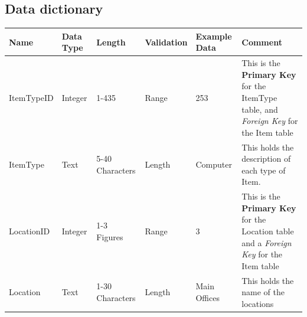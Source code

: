 \begin{landscape}

    \begin{center}
    \subsection{Data dictionary}
    \end{center}
    
    \begin{center}
        \begin{tabular}{|p{3cm}|p{2cm}|p{3cm}|p{2cm}|p{2cm}|p{5cm}|}
            \hline
            \textbf{Name} & \textbf{Data Type} & \textbf{Length} & \textbf{Validation} & \textbf{Example Data} & \textbf{Comment} \\ \hline
            ItemTypeID & Integer & 1-435           & Range  & 253           & This is the \textbf{Primary Key} for the ItemType table, and \emph{Foreign Key} for the 
                                                                              Item table \\ \hline
            ItemType   & Text    & 5-40 Characters & Length & Computer      & This holds the description of each type of Item. \\ \hline
            LocationID & Integer & 1-3 Figures     & Range  & 3             & This is the \textbf{Primary Key} for the Location table and a \emph{Foreign Key} for the 
                                                                              Item table \\ \hline
            Location   & Text    & 1-30 Characters & Length & Main Offices  & This holds the name of the locations \\ \hline
            \end{tabular}
    \end{center}
\end{landscape}


